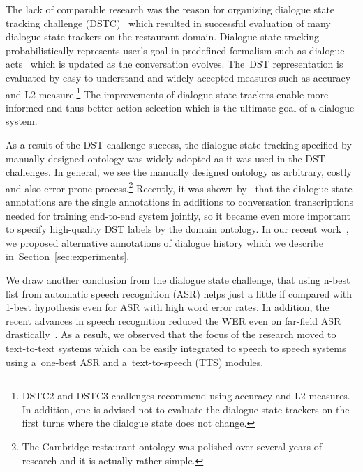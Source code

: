 \documentclass[11pt]{article}
\begin{document}
The lack of comparable research was the reason for organizing dialogue state tracking challenge (DSTC)~\cite{dstcwilliams} which resulted in successful evaluation of many dialogue state trackers on the restaurant domain.
Dialogue state tracking probabilistically represents user's goal in predefined formalism such as dialogue acts~\cite{dstcwilliams,henderson2014second,hendersonthird} which is updated as the conversation evolves.
The~DST representation is evaluated by easy to understand and widely accepted measures such as accuracy and L2 measure.\footnote{DSTC2 and DSTC3 challenges recommend using accuracy and L2 measures. In addition, one is advised not to evaluate the dialogue state trackers on the first turns where the dialogue state does not change.}
The improvements of dialogue state trackers enable more informed and thus better action selection which is the ultimate goal of a dialogue system.

As a result of the DST challenge success, the dialogue state tracking specified by manually designed ontology was widely adopted as it was used in the DST challenges.
In general, we see the manually designed ontology as arbitrary, costly and also error prone process.\footnote{The Cambridge restaurant ontology was polished over several years of research and it is actually rather simple.}
Recently, it was shown by~\cite{wen_networkbased_2016} that the dialogue state annotations are the single annotations in additions to conversation transcriptions needed for training end-to-end system jointly, so it became even more important to specify high-quality DST labels by the domain ontology.
In our recent work~\cite{platek2016wochat}, we proposed alternative annotations of dialogue history which we describe in~Section~\ref{sec:experiments}.

We draw another conclusion from the dialogue state challenge, that using n-best list from automatic speech recognition (ASR) helps just a little if compared with 1-best hypothesis even for ASR with high word error rates.
In addition, the recent advances in speech recognition reduced the WER even on far-field ASR drastically~\cite{peddinti_jhu_2015,zhang_highway_2016}.
As a result, we observed that the focus of the research moved to text-to-text systems which can be easily integrated to speech to speech systems using a~one-best ASR and a~text-to-speech (TTS) modules.
\end{document}
